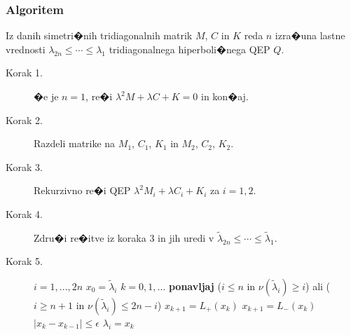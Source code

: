 \documentclass[9pt]{beamer}
\begin{document}
\begin{frame}
\frametitle{Algoritem}

Iz danih simetri�nih tridiagonalnih matrik $M$, $C$ in $K$
    reda $n$ izra�una lastne vrednosti
    $\lambda_{2n}\le\cdots\le \lambda_1$ tridiagonalnega hiperboli�nega
    QEP $Q$.

\begin{description}
  \item[Korak 1.] �e je $n=1$, re�i $\lambda^2M+\lambda C+K=0$ in kon�aj.
  \item[Korak 2.] Razdeli matrike na $M_1$, $C_1$, $K_1$ in
   $M_2$, $C_2$, $K_2$.
\item[Korak 3.] Rekurzivno re�i QEP
    $\lambda^2 M_i+\lambda C_i+K_i$ za $i=1,2$. \label{tockatri}
\item[Korak 4.] Zdru�i re�itve iz koraka 3 in jih uredi v
    $\widetilde{\lambda}_{2n}\le \cdots \le \widetilde{\lambda}_1$.
\item[Korak 5.] %

\hbox{}$i=1,\ldots,2n$\newline
\hbox{}\quad $x_0=\widetilde{\lambda}_i$\newline
\hbox{} $k=0,1,\ldots$ {\bf ponavljaj}\newline
\hbox{}\quad {} ($i\le n$ in
   $\nu(\widetilde{\lambda}_i)\ge i$) 
ali ($i \ge  n+1$ in $\nu(\widetilde{\lambda}_i)\le 2n-i$)\newline 
\hbox{}\quad \qquad\qquad $x_{k+1}=L_{+}(x_{k})$\newline
\hbox{}\quad {}\newline
\hbox{}\quad \qquad\qquad $x_{k+1}=L_{-}(x_{k})$\newline
\hbox{} $|x_{k}-x_{k-1}|\le \epsilon$\newline
\hbox{}\quad $\lambda_i=x_k$\newline
\end{description}


\end{frame}
\end{document}
